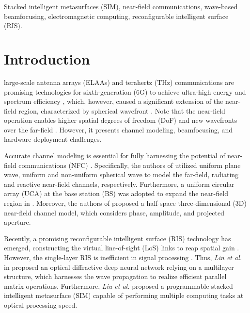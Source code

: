 \documentclass[conference]{IEEEtran}
\theoremstyle{remark}
\begin{document}
\begin{IEEEkeywords}
Stacked intelligent metasurfaces (SIM), near-field communications, wave-based beamfocusing, electromagnetic computing, reconfigurable intelligent surface (RIS).
\end{IEEEkeywords}

\section{Introduction}\label{Sec_I}
 large-scale antenna arrays (ELAAs) and terahertz (THz) communications are promising technologies for sixth-generation (6G) to achieve ultra-high energy and spectrum efficiency \cite{TAP_2024_An_Emerging, ELAAs, VTC_THz, WC_2024_An_Near}, which, however, caused a significant extension of the near-field region, characterized by spherical wavefront \cite{NF_ZengYong, NF_CB_LDMA}. Note that the near-field operation enables higher spatial degrees of freedom (DoF) and new wavefronts over the far-field \cite{NF_Liu_survey}. However, it presents channel modeling, beamfocusing, and hardware deployment challenges. 

Accurate channel modeling is essential for fully harnessing the potential of near-field communications (NFC) \cite{Group_AN_Tutorial_I}. Specifically, the authors of \cite{NF_Liu_survey} utilized uniform plane wave, uniform and non-uniform spherical wave to model the far-field, radiating and reactive near-field channels, respectively. Furthermore, a uniform circular array (UCA) at the base station (BS) was adopted to expand the near-field region in \cite{NF_2}. Moreover, the authors of \cite{NF_ZengYong} proposed a half-space three-dimensional (3D) near-field channel model, which considers phase, amplitude, and projected aperture.

Recently, a promising reconfigurable intelligent surface (RIS) technology has emerged, constructing the virtual line-of-sight (LoS) links to reap spatial gain \cite{TWC_2025_An_Flexible, IoTJ_2023_Xu_OTFS, Group_AN_CB_Mag, TCOM_2024_Yu_Environment, TCT_2024_An_Adjustable}. However, the single-layer RIS is inefficient in signal processing \cite{Group_An_SIM_JSAC}. Thus, \textit{Lin et al.} in \cite{SIM_LingXing} proposed an optical diffractive deep neural network relying on a multilayer structure, which harnesses the wave propagation to realize efficient parallel matrix operations. Furthermore, \textit{Liu et al.} \cite{SIM_Cui_Nature_2022} proposed a programmable stacked intelligent metasurface (SIM) capable of performing multiple computing tasks at optical processing speed.
\end{document}
